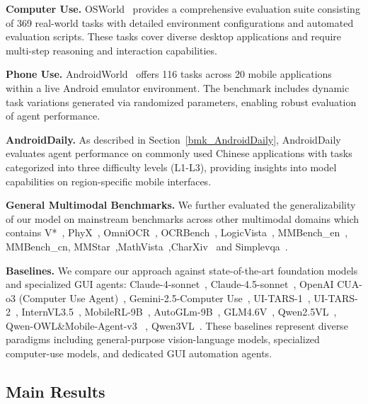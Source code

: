 \noindent\textbf{Computer Use.} OSWorld~\cite{xie2024osworld} provides a comprehensive evaluation suite consisting of 369 real-world tasks with detailed environment configurations and automated evaluation scripts. These tasks cover diverse desktop applications and require multi-step reasoning and interaction capabilities.

\noindent\textbf{Phone Use.} AndroidWorld~\cite{rawles2024androidworld} offers 116 tasks across 20 mobile applications within a live Android emulator environment. The benchmark includes dynamic task variations generated via randomized parameters, enabling robust evaluation of agent performance.

\noindent\textbf{AndroidDaily.} As described in Section~\ref{bmk_AndroidDaily}, AndroidDaily evaluates agent performance on commonly used Chinese applications with tasks categorized into three difficulty levels (L1-L3), providing insights into model capabilities on region-specific mobile interfaces.

\noindent\textbf{General Multimodal Benchmarks.}
We further evaluated the generalizability of our model on mainstream benchmarks across other multimodal domains which contains V*~\cite{wu2024v}, PhyX~\cite{shen2025phyx}, OmniOCR~\cite{Omniocr}, OCRBench~\cite{liu2024ocrbench}, LogicVista~\cite{xiao2024logicvista}, MMBench\_en~\cite{liu2024mmbench}, MMBench\_cn, MMStar~\cite{chen2024we},MathVista~\cite{lu2023mathvista},CharXiv~\cite{wang2024charxiv} and Simplevqa~\cite{cheng2025simplevqa}.

\noindent\textbf{Baselines.}
We compare our approach against state-of-the-art foundation models and specialized GUI agents: Claude-4-sonnet~\cite{claude4sonnet}, Claude-4.5-sonnet~\cite{claude45sonnet}, OpenAI CUA-o3 (Computer Use Agent)~\cite{openai_cua_o3}, Gemini-2.5-Computer Use~\cite{gemini2.5cu}, UI-TARS-1~\cite{qin2025ui_uitars1}, UI-TARS-2~\cite{wang2025ui_uitars2}, InternVL3.5~\cite{wang2025internvl3}, MobileRL-9B~\cite{xu2025mobilerl}, AutoGLm-9B~\cite{AutoGLM}, GLM4.6V~\cite{glm4.6v}, Qwen2.5VL~\cite{bai2025qwen2}, Qwen-OWL\&Mobile-Agent-v3 ~\cite{ye2025mobile_mobileagentv3}, Qwen3VL~\cite{Bai2025Qwen3VL}. These baselines represent diverse paradigms including general-purpose vision-language models, specialized computer-use models, and dedicated GUI automation agents.





\subsection{Main Results}


